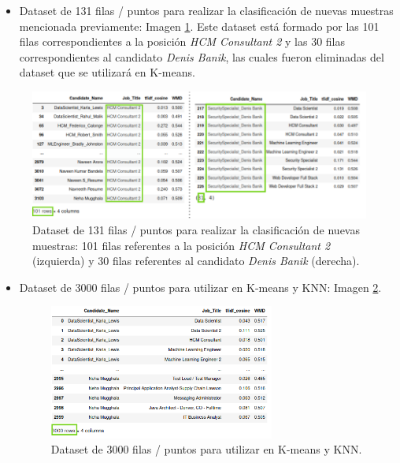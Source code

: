 \documentclass[12pt,a4paper]{article}
\begin{document}
\begin{sloppypar}
\begin{itemize}

\item Dataset de 131 filas / puntos para realizar la clasificación de nuevas muestras mencionada previamente: Imagen \ref{fig:eliminacion_hcm_2_y_denis}. Este dataset está formado por las 101 filas correspondientes a la posición \textit{HCM Consultant 2} y las 30 filas correspondientes al candidato \textit{Denis Banik}, las cuales fueron eliminadas del dataset que se utilizará en K-means.

\end{itemize}

\begin{figure}[H]   
\centering
\includegraphics[width=1\textwidth]{images/implementacion_5/eliminacion_hcm_2_y_denis.png}
\caption{Dataset de 131 filas / puntos para realizar la clasificación de nuevas muestras: 101 filas referentes a la posición \textit{HCM Consultant 2} (izquierda) y 30 filas referentes al candidato \textit{Denis Banik} (derecha).}
\label{fig:eliminacion_hcm_2_y_denis}
\end{figure}

\begin{itemize}

\item Dataset de 3000 filas / puntos para utilizar en K-means y KNN: Imagen \ref{fig:dataset_kmeans_knn_final}.

\begin{figure}[H]   
\centering
\includegraphics[width=0.7\textwidth]{images/implementacion_5/dataset_kmeans_knn_final.png}
\caption{Dataset de 3000 filas / puntos para utilizar en K-means y KNN.}
\label{fig:dataset_kmeans_knn_final}
\end{figure}


\end{itemize}
\end{sloppypar}
\end{document}
